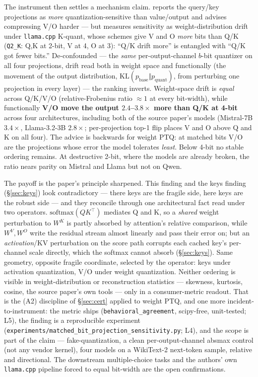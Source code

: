 \documentclass[11pt]{article}
\begin{document}
The instrument then settles a mechanism claim. \cite{illusion} reports the
query/key projections as \emph{more} quantization-sensitive than value/output
and advises compressing V/O harder --- but measures sensitivity as
weight-distribution drift under \texttt{llama.cpp} K-quant, whose schemes give V
and O \emph{more} bits than Q/K (\texttt{Q2\_K}: Q,K at 2-bit, V at 4, O at 3):
``Q/K drift more'' is entangled with ``Q/K got fewer bits.'' De-confounded ---
the \emph{same} per-output-channel $b$-bit quantizer on all four projections,
drift read both in weight space and functionally (the movement of the output
distribution, $\mathrm{KL}(p_{\text{base}}\Vert p_{\text{quant}})$, from
perturbing one projection in every layer) --- the ranking inverts.
Weight-space drift is \emph{equal} across Q/K/V/O (relative-Frobenius ratio
$\approx 1$ at every bit-width), while functionally \textbf{V/O move the output
$2.4$--$3.8\times$ more than Q/K at 4-bit} across four architectures, including
both of the source paper's models (Mistral-7B $3.4\times$, Llama-3.2-3B
$2.8\times$; per-projection top-1 flip places V and O above Q and K on all
four). The advice is backwards for weight PTQ: at matched bits
V/O are the projections whose error the model tolerates \emph{least}. Below
4-bit no stable ordering remains. At destructive 2-bit, where the models are
already broken, the ratio nears parity on Mistral and Llama but not on Qwen.

The payoff is the paper's principle sharpened. This finding and the keys
finding (\S\ref{sec:keys}) look contradictory --- there keys are the fragile
side, here keys are the robust side --- and they reconcile through one
architectural fact read under two operators. $\mathrm{softmax}(QK^\top)$
mediates Q and K, so a \emph{shared} weight perturbation to $W^K$ is partly
absorbed by attention's relative comparison, while $W^V,W^O$ write the residual
stream almost linearly and pass their error on; but an \emph{activation}/KV
perturbation on the score path corrupts each cached key's per-channel scale
directly, which the softmax cannot absorb (\S\ref{sec:keys}). Same geometry,
opposite fragile coordinate, selected by the operator: keys under activation
quantization, V/O under weight quantization. Neither ordering is visible in
weight-distribution or reconstruction statistics --- skewness, kurtosis,
cosine, the source paper's own tools --- only in a consumer-metric readout.
That is the (A2) discipline of \S\ref{sec:cert} applied to weight PTQ, and one
more incident-to-instrument: the metric ships (\texttt{behavioral\_agreement},
scipy-free, unit-tested; L5), the finding is a reproducible experiment
(\texttt{experiments/matched\_bit\_projection\_sensitivity.py}; L4), and the
scope is part of the claim --- fake-quantization, a clean per-output-channel
absmax control (not any vendor kernel), four models on a WikiText-2 next-token
sample, relative and directional. The downstream multiple-choice tasks and the
authors' own \texttt{llama.cpp} pipeline forced to equal bit-width are the open
confirmations.
\end{document}
